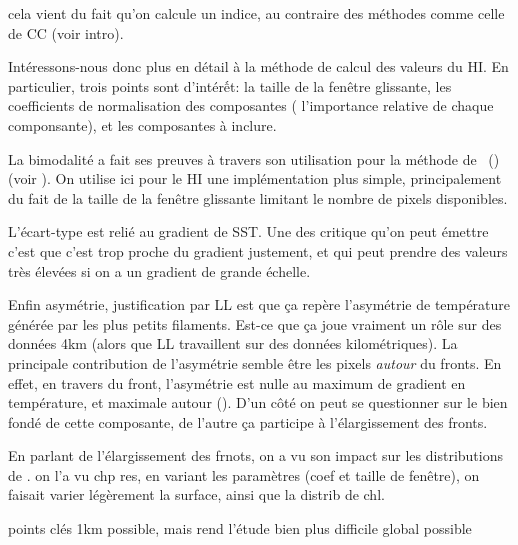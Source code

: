 cela vient du fait qu'on calcule un indice, au contraire des méthodes comme celle de CC (voir intro).

Intéressons-nous donc plus en détail à la méthode de calcul des valeurs du HI.
En particulier, trois points sont d'intérết: la taille de la fenêtre glissante, les coefficients de normalisation des composantes ( l'importance relative de chaque componsante), et les composantes à inclure.

La bimodalité a fait ses preuves à travers son utilisation pour la méthode de ~() (voir ).
On utilise ici pour le HI une implémentation plus simple, principalement du fait de la taille de la fenêtre glissante limitant le nombre de pixels disponibles.

L'écart-type est relié au gradient de SST. Une des critique qu'on peut émettre c'est que c'est trop proche du gradient justement, et qui peut prendre des valeurs très élevées si on a un gradient de grande échelle.

Enfin asymétrie, justification par LL est que ça repère l'asymétrie de température générée par les plus petits filaments.
Est-ce que ça joue vraiment un rôle sur des données 4km (alors que LL travaillent sur des données kilométriques).
La principale contribution de l'asymétrie semble être les pixels \emph{autour} du fronts.
En effet, en travers du front, l'asymétrie est nulle au maximum de gradient en température, et maximale autour ().
D'un côté on peut se questionner sur le bien fondé de cette composante, de l'autre ça participe à l'élargissement des fronts.

\begin{figure}
  \centering
  \label{fig:asymetrie}
\end{figure}

En parlant de l'élargissement des frnots, on a vu son impact sur les distributions de .
on l'a vu chp res, en variant les paramètres (coef et taille de fenêtre), on faisait varier légèrement la surface, ainsi que la distrib de chl.

points clés
1km possible, mais rend l'étude bien plus difficile
global possible


